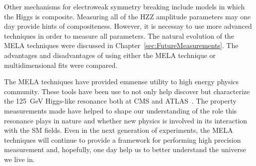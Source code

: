 Other mechanisms for electroweak symmetry breaking include 
models in which the Higgs is composite.  Measuring all of
the HZZ amplitude parameters may one day provide
hints of compositeness.  However, it is necessay to use 
more advanced techniques in order to measure all parameters.
The natural evolution of the MELA techniques were discussed in 
Chapter~\ref{sec:FutureMeasurements}.  
The advantages and disadvantages of using either the MELA 
technique or multidimensional fits were compared.
  
The MELA techniques have provided emmense utility
to high energy physics community.  These tools have been use to
not only help discover but characterize the 125~GeV Higgs-like
resonance both at CMS and ATLAS~\cite{ATLAS:2013nma}.  The property
measurements made have helped to shape our understanding of the
role this resonance plays in nature and whether new physics is
involved in its interaction with the SM fields.  Even in the next 
generation of experiments, the MELA techniques will
continue to provide a framework for performing high precision
measurement and, hopefully, one day help us to better understand
the universe we live in.



